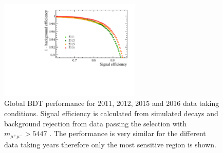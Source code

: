 \begin{figure}[htbp]
    \centering
       \includegraphics[width=0.6\textwidth]{./Figs/Selection/ROC_zoom.pdf}
        \caption{Global BDT performance for 2011, 2012, 2015 and 2016 data taking conditions. Signal efficiency is calculated from \bsmumu simulated decays and background rejection from data passing the \bsmumu selection with $m_{\mu^{+}\mu^{-}} > 5447$ \mevcc. The performance is very similar for the different data taking years therefore only the most sensitive region is shown.}
    \label{fig:BDTperformance}
\end{figure}


